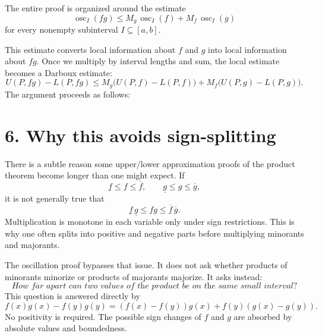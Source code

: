 \documentclass[11pt]{article}
\DeclareMathOperator{\osc}{osc}
\theoremstyle{plain}
\theoremstyle{remark}
\begin{document}
The entire proof is organized around the estimate
\[
    \boxed{\;
    \osc_I(fg)
    \leq
    M_g\,\osc_I(f)+M_f\,\osc_I(g)
    \;}
\]
for every nonempty subinterval $I\subseteq [a,b]$.

This estimate converts local information about $f$ and $g$ into local information about $fg$. Once we multiply by interval lengths and sum, the local estimate becomes a Darboux estimate:
\[
    U(P,fg)-L(P,fg)
    \leq
    M_g\bigl(U(P,f)-L(P,f)\bigr)
    +M_f\bigl(U(P,g)-L(P,g)\bigr).
\]
The argument proceeds as follows:

\begin{center}
\end{center}

\section*{6. Why this avoids sign-splitting}

There is a subtle reason some upper/lower approximation proofs of the product theorem become longer than one might expect. If
\[
    \underline f\leq f\leq \overline f,
    \qquad
    \underline g\leq g\leq \overline g,
\]
it is not generally true that
\[
    \underline f\,\underline g\leq fg\leq \overline f\,\overline g.
\]
Multiplication is monotone in each variable only under sign restrictions. This is why one often splits into positive and negative parts before multiplying minorants and majorants.

The oscillation proof bypasses that issue. It does not ask whether products of minorants minorize or products of majorants majorize. It asks instead:
\[
    \textit{How far apart can two values of the product be on the same small interval?}
\]
This question is answered directly by
\[
    f(x)g(x)-f(y)g(y)
    =(f(x)-f(y))g(x)+f(y)(g(x)-g(y)).
\]
No positivity is required. The possible sign changes of $f$ and $g$ are absorbed by absolute values and boundedness.
\end{document}
